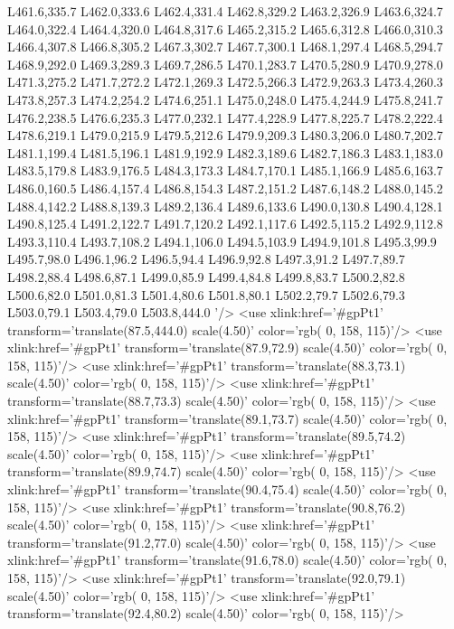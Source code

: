		L461.6,335.7 L462.0,333.6 L462.4,331.4 L462.8,329.2 L463.2,326.9 L463.6,324.7 L464.0,322.4 L464.4,320.0
		L464.8,317.6 L465.2,315.2 L465.6,312.8 L466.0,310.3 L466.4,307.8 L466.8,305.2 L467.3,302.7 L467.7,300.1
		L468.1,297.4 L468.5,294.7 L468.9,292.0 L469.3,289.3 L469.7,286.5 L470.1,283.7 L470.5,280.9 L470.9,278.0
		L471.3,275.2 L471.7,272.2 L472.1,269.3 L472.5,266.3 L472.9,263.3 L473.4,260.3 L473.8,257.3 L474.2,254.2
		L474.6,251.1 L475.0,248.0 L475.4,244.9 L475.8,241.7 L476.2,238.5 L476.6,235.3 L477.0,232.1 L477.4,228.9
		L477.8,225.7 L478.2,222.4 L478.6,219.1 L479.0,215.9 L479.5,212.6 L479.9,209.3 L480.3,206.0 L480.7,202.7
		L481.1,199.4 L481.5,196.1 L481.9,192.9 L482.3,189.6 L482.7,186.3 L483.1,183.0 L483.5,179.8 L483.9,176.5
		L484.3,173.3 L484.7,170.1 L485.1,166.9 L485.6,163.7 L486.0,160.5 L486.4,157.4 L486.8,154.3 L487.2,151.2
		L487.6,148.2 L488.0,145.2 L488.4,142.2 L488.8,139.3 L489.2,136.4 L489.6,133.6 L490.0,130.8 L490.4,128.1
		L490.8,125.4 L491.2,122.7 L491.7,120.2 L492.1,117.6 L492.5,115.2 L492.9,112.8 L493.3,110.4 L493.7,108.2
		L494.1,106.0 L494.5,103.9 L494.9,101.8 L495.3,99.9 L495.7,98.0 L496.1,96.2 L496.5,94.4 L496.9,92.8
		L497.3,91.2 L497.7,89.7 L498.2,88.4 L498.6,87.1 L499.0,85.9 L499.4,84.8 L499.8,83.7 L500.2,82.8
		L500.6,82.0 L501.0,81.3 L501.4,80.6 L501.8,80.1 L502.2,79.7 L502.6,79.3 L503.0,79.1 L503.4,79.0
		L503.8,444.0  '/>	<use xlink:href='#gpPt1' transform='translate(87.5,444.0) scale(4.50)' color='rgb(  0, 158, 115)'/>
	<use xlink:href='#gpPt1' transform='translate(87.9,72.9) scale(4.50)' color='rgb(  0, 158, 115)'/>
	<use xlink:href='#gpPt1' transform='translate(88.3,73.1) scale(4.50)' color='rgb(  0, 158, 115)'/>
	<use xlink:href='#gpPt1' transform='translate(88.7,73.3) scale(4.50)' color='rgb(  0, 158, 115)'/>
	<use xlink:href='#gpPt1' transform='translate(89.1,73.7) scale(4.50)' color='rgb(  0, 158, 115)'/>
	<use xlink:href='#gpPt1' transform='translate(89.5,74.2) scale(4.50)' color='rgb(  0, 158, 115)'/>
	<use xlink:href='#gpPt1' transform='translate(89.9,74.7) scale(4.50)' color='rgb(  0, 158, 115)'/>
	<use xlink:href='#gpPt1' transform='translate(90.4,75.4) scale(4.50)' color='rgb(  0, 158, 115)'/>
	<use xlink:href='#gpPt1' transform='translate(90.8,76.2) scale(4.50)' color='rgb(  0, 158, 115)'/>
	<use xlink:href='#gpPt1' transform='translate(91.2,77.0) scale(4.50)' color='rgb(  0, 158, 115)'/>
	<use xlink:href='#gpPt1' transform='translate(91.6,78.0) scale(4.50)' color='rgb(  0, 158, 115)'/>
	<use xlink:href='#gpPt1' transform='translate(92.0,79.1) scale(4.50)' color='rgb(  0, 158, 115)'/>
	<use xlink:href='#gpPt1' transform='translate(92.4,80.2) scale(4.50)' color='rgb(  0, 158, 115)'/>
